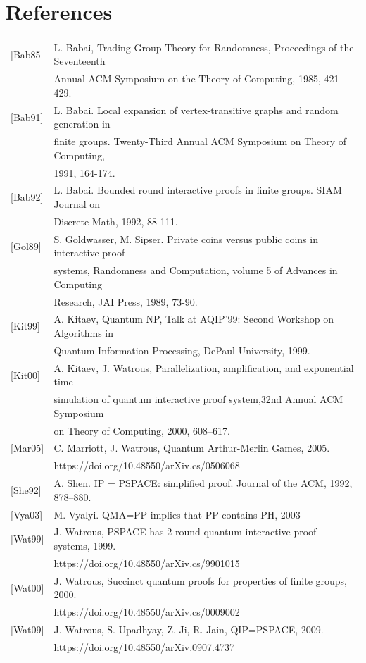 \documentclass[12pt]{article}
\numberwithin{thm}{section}
\numberwithin{defn}{section}
\numberwithin{prop}{section}
\numberwithin{rmk}{section}
\begin{document}
	\section*{References}
	\begin{tabular}{ l l }
		\label{bab}[Bab85] & L. Babai, Trading Group Theory for Randomness, Proceedings of the Seventeenth\\& Annual ACM
		Symposium on the Theory of Computing, 1985, 421-429.\\
		\label{bab91}[Bab91] & L. Babai. Local expansion of vertex-transitive graphs and random generation in\\ & finite groups. Twenty-Third Annual ACM Symposium on Theory of Computing,\\& 1991, 164-174.\\
		\label{bab92}[Bab92] & L. Babai. Bounded round interactive proofs in finite groups. SIAM Journal on\\& Discrete Math, 1992, 88-111.\\
		\label{gol89}[Gol89] & S. Goldwasser, M. Sipser. Private coins versus public coins in interactive proof \\& systems, Randomness and Computation, volume 5 of Advances in Computing\\& Research, JAI Press, 1989, 73-90.\\
		\label{kit99}[Kit99] & A. Kitaev, Quantum NP, Talk at AQIP’99: Second Workshop on Algorithms in\\& Quantum
		Information Processing, DePaul University, 1999.\\
		\label{kit00}[Kit00] & A. Kitaev, J. Watrous, Parallelization, amplification, and exponential time\\& simulation of quantum interactive proof system,32nd Annual ACM Symposium\\& on Theory of Computing, 2000, 608–617.\\
		\label{mar05}[Mar05] & C. Marriott, J. Watrous, Quantum Arthur-Merlin Games, 2005. \\&https://doi.org/10.48550/arXiv.cs/0506068\\
		\label{she92}[She92] & A. Shen. IP = PSPACE: simplified proof. Journal of the ACM, 1992, 878–880.\\
		\label{vya03}[Vya03] & M. Vyalyi. QMA=PP implies that PP contains PH, 2003\\
		\label{wat99}[Wat99] & J. Watrous, PSPACE has 2-round quantum interactive proof systems, 1999. \\&https://doi.org/10.48550/arXiv.cs/9901015\\
		\label{wat00}[Wat00] & J. Watrous, Succinct quantum proofs for properties of finite groups, 2000. \\&https://doi.org/10.48550/arXiv.cs/0009002\\
		\label{wat09}[Wat09] & J. Watrous, S. Upadhyay, Z. Ji, R. Jain, QIP=PSPACE, 2009.
		\\&https://doi.org/10.48550/arXiv.0907.4737
		
	\end{tabular}
	
		
\end{document}
